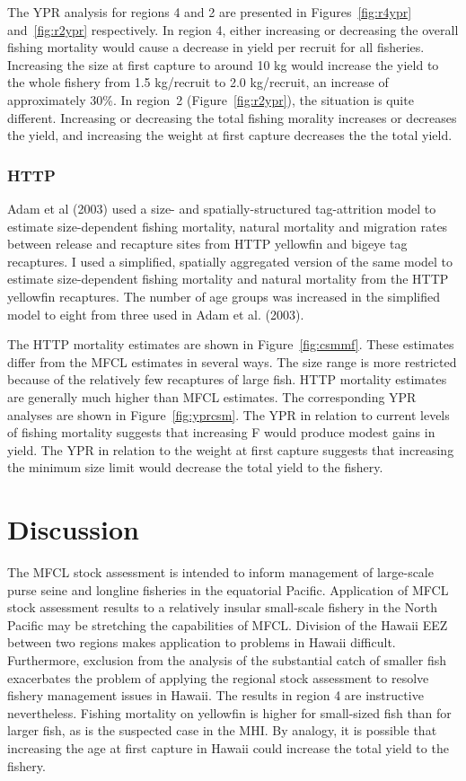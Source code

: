 \documentclass[12pt,letterpaper,twoside]{article}
\begin{document}
The YPR analysis for regions 4 and 2 are
presented in Figures~\ref{fig:r4ypr} and~\ref{fig:r2ypr} respectively.
In region 4, either increasing or decreasing the overall fishing
mortality would cause a decrease in yield per recruit for all
fisheries.
Increasing the size at first capture to around 10 kg would increase the
yield to the whole fishery from 1.5 kg/recruit to 2.0
kg/recruit, an increase of approximately 30\%.
In region~2 (Figure~\ref{fig:r2ypr}), the situation is quite different. 
Increasing or decreasing the total fishing morality increases
or decreases the yield, and
increasing the weight at first capture decreases the
the total yield.

\subsubsection*{HTTP}
Adam et al (2003) used a size- and spatially-structured
tag-attrition model to estimate
size-dependent fishing mortality, natural
mortality and migration rates between release and recapture sites from
HTTP yellowfin and bigeye tag recaptures. 
I used a simplified, spatially aggregated version of the same
model to estimate size-dependent fishing
mortality and natural mortality from the HTTP yellowfin recaptures.
The number of age groups was increased in the simplified model
to eight from three used in Adam et al. (2003).

The HTTP mortality estimates are shown in Figure~\ref{fig:csmmf}.
These estimates differ from the MFCL estimates in several ways. The
size range is more restricted because of the relatively few
recaptures of large fish. HTTP mortality estimates
are generally much higher than MFCL estimates.
The corresponding YPR analyses are shown in Figure~\ref{fig:yprcsm}.
The YPR in relation to current levels of fishing mortality suggests
that increasing F would produce modest gains in yield.
The YPR in relation to the weight at first capture suggests that
increasing the minimum size limit would decrease the
total yield to the fishery.


\section*{Discussion}
The MFCL stock assessment is intended to inform management of
large-scale purse seine and longline fisheries in the equatorial Pacific.
Application of MFCL stock assessment results to a relatively insular
small-scale fishery in the North Pacific may be stretching the
capabilities of MFCL. Division of the Hawaii EEZ between two regions
makes application to problems in Hawaii difficult. Furthermore,
exclusion from the analysis of the substantial catch of smaller fish exacerbates
the problem of applying the regional stock assessment to
resolve fishery management issues in Hawaii. The results in region 4
are instructive nevertheless.
Fishing mortality on yellowfin is higher for small-sized fish than for
larger fish, as is the suspected case in the MHI. By analogy, it is
possible that increasing the age at first capture in Hawaii could increase
the total yield to the fishery. 
\end{document}
